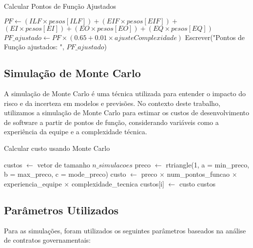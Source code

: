 \documentclass[12pt]{article}
\begin{document}
\begin{algorithm}[H]
\caption{Calcular Pontos de Função Ajustados}
\begin{algorithmic}[1]
    \State $PF \gets (ILF \times pesos[ILF]) + (EIF \times pesos[EIF]) +$
    \State \hspace{3.5em} $(EI \times pesos[EI]) + (EO \times pesos[EO]) + (EQ \times pesos[EQ])$
    \State $PF\_ajustado \gets PF \times (0.65 + 0.01 \times ajusteComplexidade)$
    \State Escrever("Pontos de Função ajustados: ", $PF\_ajustado$)
\EndProcedure
\end{algorithmic}
\end{algorithm}


\subsection{Simulação de Monte Carlo}

A simulação de Monte Carlo é uma técnica utilizada para entender o impacto do risco e da incerteza em modelos e previsões. No contexto deste trabalho, utilizamos a simulação de Monte Carlo para estimar os custos de desenvolvimento de software a partir de pontos de função, considerando variáveis como a experiência da equipe e a complexidade técnica.

\begin{algorithm}[H]
\caption{Calcular custo usando Monte Carlo}
\begin{algorithmic}[1]
    \State custos $\leftarrow$ vetor de tamanho $n\_simulacoes$
        \State preco $\leftarrow$ rtriangle(1, a = min\_preco, b = max\_preco, c = mode\_preco)
        \State custo $\leftarrow$ preco $\times$ num\_pontos\_funcao $\times$ experiencia\_equipe $\times$ complexidade\_tecnica
        \State custos[i] $\leftarrow$ custo
    \EndFor
    \State \Return custos
\EndProcedure
\end{algorithmic}
\end{algorithm}

\subsection{Parâmetros Utilizados}

Para as simulações, foram utilizados os seguintes parâmetros baseados na análise de contratos governamentais:
\end{document}
